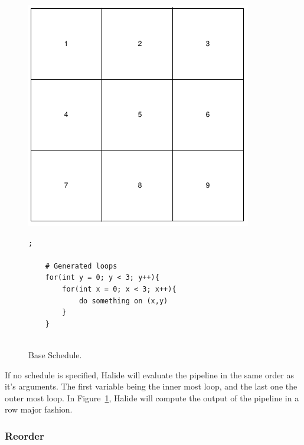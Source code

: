 \begin{figure}[h]
		\begin{minipage}[c]{\EIW}
			\centering
		\includegraphics[width=\textwidth]{Images/BaseOrder.png}
		\end{minipage}
		\begin{minipage}[c]{\ECW}
			\centering
\begin{lstlisting}[label={code:reorder}];
			
	# Generated loops
	for(int y = 0; y < 3; y++){
		for(int x = 0; x < 3; x++){
			do something on (x,y)
		}
	}
	
\end{lstlisting}
		\end{minipage}
	\caption{Base Schedule.}
	\label{schedule:default}
\end{figure}



	If no schedule is specified, Halide will evaluate the pipeline in the same order as it's arguments. The first variable being the inner most loop, and the last one the outer most loop. In Figure~\ref{schedule:default}, Halide will compute the output of the pipeline in a row major fashion.

	\subsubsection{Reorder}

